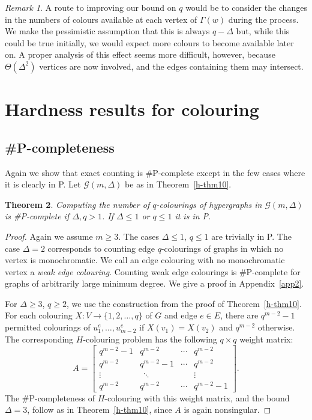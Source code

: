 \documentclass[11pt]{article}
\newtheorem{thm}{Theorem}[section]
\theoremstyle{definition}
\theoremstyle{remark}
\newtheorem{rem}[thm]{Remark}
\newcommand{\CG}{\mathcal{G}}
\begin{document}
\begin{rem}
A route to improving our bound on $q$ would be to consider the changes in
the numbers of colours available at each vertex of $\Gamma(w)$ during the
process. We make the pessimistic assumption that this is always $q-\Delta$
but, while this could be true initially, we would expect more colours to
become available later on. A proper analysis of this effect seems more
difficult, however, because $\Theta(\Delta^2)$ vertices are now involved,
and the edges containing them may intersect.
\end{rem}
\section{Hardness results for colouring}\label{sec:hardcol}
\subsection{\#P-completeness}
Again we show that exact counting is \#P-complete except in the few cases
where it is clearly in P. Let $\CG(m,\Delta)$ be as in
Theorem~\ref{h-thm10}.
\begin{thm}\label{h-thm40}
Computing the number of $q$-colourings of hypergraphs in $\CG(m,\Delta)$ is
\#P-complete if $\Delta,q > 1$. If $\Delta \leq 1$ or $q\leq 1$ it is in P.
\end{thm}
\begin{proof}
Again we assume $m\geq 3$. The cases $\Delta\leq 1$, $q\leq 1$ are
trivially in P. The case $\Delta=2$ corresponds to counting edge
$q$-colourings of graphs in which no vertex is monochromatic. We call an
edge colouring with no monochromatic vertex a \emph{weak edge colouring}.
Counting weak edge colourings is \#P-complete for graphs of arbitrarily
large minimum degree. We give a proof in Appendix~\ref{app2}.

For $\Delta \geq 3$, $q\geq 2$, we use the construction from the proof of
Theorem~\ref{h-thm10}. For each colouring $X:V\rightarrow \{1,2,\ldots,q\}$
of $G$ and edge $e\in E$, there are $q^{m-2}-1$ permitted colourings of
$u^e_1,\ldots, u^e_{m-2}$ if $X(v_1)=X(v_2)$ and $q^{m-2}$ otherwise. The
corresponding $H$-colouring problem has the following $q\times q$ weight
matrix:
\[ A=\begin{bmatrix} q^{m-2}-1 & q^{m-2} & \cdots & q^{m-2}\\
q^{m-2} & q^{m-2}-1& \cdots& q^{m-2}\\
\vdots&\ \ \ddots&&\vdots\\
q^{m-2} & q^{m-2}& \cdots & q^{m-2}-1\end{bmatrix}.\]
The \#P-completeness of $H$-colouring with this weight matrix, and
the bound $\Delta=3$, follow as in Theorem~\ref{h-thm10},
since $A$ is again nonsingular.
\end{proof}
\end{document}
